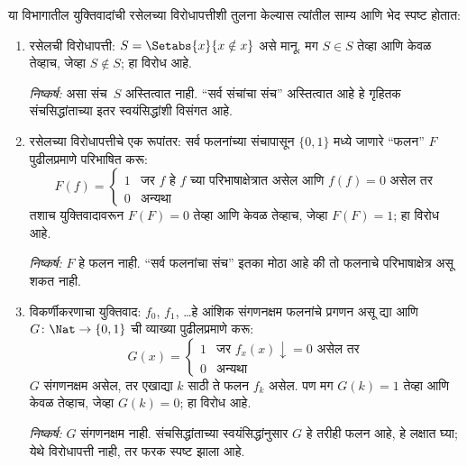 या विभागातील युक्तिवादांची रसेलच्या विरोधापत्तीशी तुलना केल्यास
त्यांतील साम्य आणि भेद स्पष्ट होतात:
\begin{enumerate}
\item रसेलची विरोधापत्ती: $S = \Setabs{x}{x \notin x}$ असे मानू.
  मग $S
  \in S$ तेव्हा आणि केवळ तेव्हाच, जेव्हा $S \notin S$; हा विरोध आहे.

  \emph{निष्कर्ष:} असा संच~$S$ अस्तित्वात नाही. ``सर्व संचांचा संच''
  अस्तित्वात आहे हे गृहितक संचसिद्धांताच्या इतर स्वयंसिद्धांशी विसंगत आहे.


\item रसेलच्या विरोधापत्तीचे एक रूपांतर: सर्व फलनांच्या संचापासून
  $\{ 0, 1 \}$ मध्ये जाणारे ``फलन'' $F$ पुढीलप्रमाणे परिभाषित करू:
  \[  F(f) =
  \begin{cases}
    1 & \text{जर $f$ हे $f$ च्या परिभाषाक्षेत्रात असेल आणि $f(f) = 0$ असेल तर} \\
    0 & \text{अन्यथा}
  \end{cases}
  \]
  तशाच युक्तिवादावरून $F(F) = 0$ तेव्हा आणि केवळ तेव्हाच, जेव्हा
  $F(F) = 1$; हा विरोध आहे.

  \emph{निष्कर्ष:} $F$ हे फलन नाही. ``सर्व फलनांचा संच'' इतका
  मोठा आहे की तो फलनाचे परिभाषाक्षेत्र असू शकत नाही.

\item विकर्णीकरणाचा युक्तिवाद: $f_0$, $f_1$, \dots हे आंशिक
  संगणनक्षम फलनांचे प्रगणन असू द्या आणि $G \colon \Nat \to
  \{ 0, 1 \}$ ची व्याख्या पुढीलप्रमाणे करू:
  \[  G(x) =
  \begin{cases}
    1 & \text{जर $f_x(x)\downarrow = 0$ असेल तर} \\
    0 & \text{अन्यथा}
  \end{cases}
  \]
  $G$ संगणनक्षम असेल, तर एखाद्या $k$ साठी ते फलन $f_k$
  असेल. पण मग $G(k) = 1$ तेव्हा आणि केवळ तेव्हाच, जेव्हा $G(k) = 0$;
  हा विरोध आहे.

  \emph{निष्कर्ष:} $G$ संगणनक्षम नाही. संचसिद्धांताच्या
  स्वयंसिद्धांनुसार $G$ हे तरीही फलन आहे, हे लक्षात घ्या;
  येथे विरोधापत्ती नाही, तर फरक स्पष्ट झाला आहे.
\end{enumerate}

